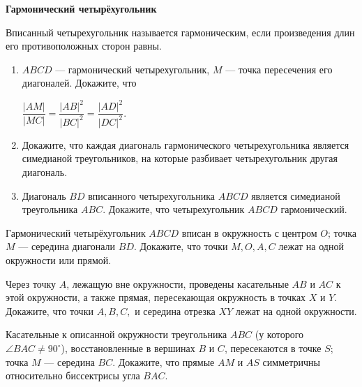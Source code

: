 \documentclass{article}
\begin{document}
    \large

    \begin{center}
        \textbf{Гармонический четырёхугольник}
    \end{center}

    \begin{definition}
        Вписанный четырехугольник называется гармоническим, если произведения длин
        его противоположных сторон равны.
    \end{definition}

    \begin{enumerate_boxed}

        \item
        \begin{enumerate}
            \item $ABCD$ — гармонический четырехугольник, $M$ — точка пересечения его диагоналей.
            Докажите, что

            $\dfrac{|AM|}{|MC|}=\dfrac{|AB|^2}{|BC|^2}=\dfrac{|AD|^2}{|DC|^2}.$
            \item Докажите, что каждая диагональ гармонического четырехугольника является симедианой
            треугольников, на которые разбивает четырехугольник другая диагональ.

            \item Диагональ $BD$ вписанного четырехугольника $ABCD$ является симедианой треугольника
            $ABC$.
            Докажите, что четырехугольник $ABCD$ гармонический.
        \end{enumerate}

        \item Гармонический четырёхугольник $ABCD$ вписан в окружность с центром $O$; точка $M$ — середина диагонали $BD$.
        Докажите, что точки $M, O, A, C$ лежат на одной окружности или прямой.

        \item Через точку $A$, лежащую вне окружности, проведены касательные $AB$ и $AC$ к этой окружности, а также прямая, пересекающая окружность в точках $X$ и $Y$.
        Докажите, что точки $A, B, C,$ и середина отрезка $XY$ лежат на одной окружности.

        \item Касательные к описанной окружности треугольника $ABC$ (у которого $\angle BAC \neq 90^\circ$), восстановленные в вершинах $B$ и $C$, пересекаются в точке $S$; точка $M$ — середина $BC$.
        Докажите, что прямые $AM$ и $AS$ симметричны относительно биссектрисы угла $BAC$.


\end{enumerate_boxed}
\end{document}
